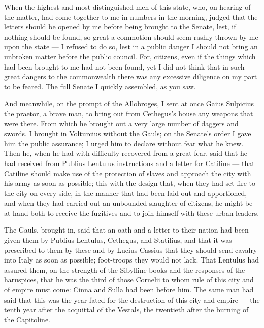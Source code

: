  When the highest and most distinguished men of this state, who, on hearing of the matter, had come together to me in numbers in the morning, judged that the letters should be opened by me before being brought to the Senate, lest, if nothing should be found, so great a commotion should seem rashly thrown by me upon the state --- I refused to do so, lest in a public danger I should not bring an unbroken matter before the public council. For, citizens, even if the things which had been brought to me had not been found, yet I did not think that in such great dangers to the commonwealth there was any excessive diligence on my part to be feared. The full Senate I quickly assembled, as you saw.

 And meanwhile, on the prompt of the Allobroges, I sent at once Gaius Sulpicius the praetor, a brave man, to bring out from Cethegus's house any weapons that were there. From which he brought out a very large number of daggers and swords. I brought in Volturcius without the Gauls; on the Senate's order I gave him the public assurance; I urged him to declare without fear what he knew. Then he, when he had with difficulty recovered from a great fear, said that he had received from Publius Lentulus instructions and a letter for Catiline --- that Catiline should make use of the protection of slaves and approach the city with his army as soon as possible; this with the design that, when they had set fire to the city on every side, in the manner that had been laid out and apportioned, and when they had carried out an unbounded slaughter of citizens, he might be at hand both to receive the fugitives and to join himself with these urban leaders.

 The Gauls, brought in, said that an oath and a letter to their nation had been given them by Publius Lentulus, Cethegus, and Statilius, and that it was prescribed to them by these and by Lucius Cassius that they should send cavalry into Italy as soon as possible; foot-troops they would not lack. That Lentulus had assured them, on the strength of the Sibylline books and the responses of the haruspices, that he was the third of those Cornelii to whom rule of this city and of empire must come: Cinna and Sulla had been before him. The same man had said that this was the year fated for the destruction of this city and empire --- the tenth year after the acquittal of the Vestals, the twentieth after the burning of the Capitoline.

